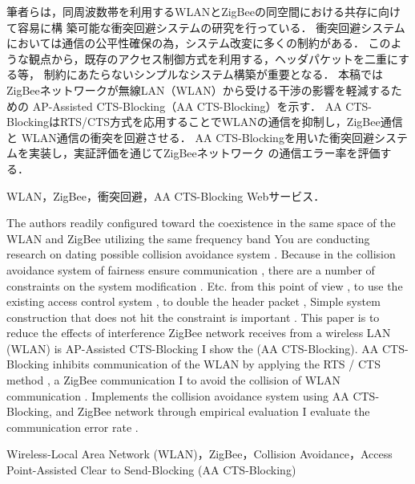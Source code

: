 \documentclass[technicalreport]{ieicej}
\begin{document}
\begin{jabstract}
 筆者らは，同周波数帯を利用するWLANとZigBeeの同空間における共存に向けて容易に構
 築可能な衝突回避システムの研究を行っている．
 衝突回避システムにおいては通信の公平性確保の為，システム改変に多くの制約がある．
 このような観点から，既存のアクセス制御方式を利用する，ヘッダパケットを二重にする等，
 制約にあたらないシンプルなシステム構築が重要となる．
 本稿ではZigBeeネットワークが無線LAN（WLAN）から受ける干渉の影響を軽減するための
 AP-Assisted CTS-Blocking（AA CTS-Blocking）を示す．
 AA CTS-BlockingはRTS/CTS方式を応用することでWLANの通信を抑制し，ZigBee通信と
 WLAN通信の衝突を回避させる．
 AA CTS-Blockingを用いた衝突回避システムを実装し，実証評価を通じてZigBeeネットワーク
 の通信エラー率を評価する．
\end{jabstract}

\begin{jkeyword}
 WLAN，ZigBee，衝突回避，AA CTS-Blocking
 Webサービス．
\end{jkeyword}

\begin{eabstract}
 The authors readily configured toward the coexistence in the same space of the WLAN and ZigBee utilizing the same frequency band
 You are conducting research on dating possible collision avoidance system .
 Because in the collision avoidance system of fairness ensure communication , there are a number of constraints on the system modification .
 Etc. from this point of view , to use the existing access control system , to double the header packet ,
 Simple system construction that does not hit the constraint is important .
 This paper is to reduce the effects of interference ZigBee network receives from a wireless LAN (WLAN) is
 AP-Assisted CTS-Blocking I show the (AA CTS-Blocking).
 AA CTS-Blocking inhibits communication of the WLAN by applying the RTS / CTS method , a ZigBee communication
 I to avoid the collision of WLAN communication .
 Implements the collision avoidance system using AA CTS-Blocking, and ZigBee network through empirical evaluation
 I evaluate the communication error rate .
\end{eabstract}

\begin{ekeyword}
 Wireless-Local Area Network (WLAN)，ZigBee，Collision Avoidance，Access Point-Assisted 
 Clear to Send-Blocking (AA CTS-Blocking)
\end{ekeyword}
\end{document}
